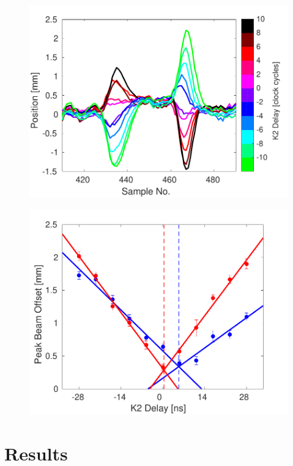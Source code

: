 \documentclass[%
 reprint,
 superscriptaddress,
 amsmath,
 amssymb,
 prstab,
]{revtex4-1}
\begin{document}
\begin{figure}
	\includegraphics[width=\columnwidth]{figs/comis/relDelay_traces}%
	\caption{\label{f:relDelay_traces}
	}
\end{figure}

\begin{figure}
	\includegraphics[width=\columnwidth]{figs/comis/relDelay_fit}%
	\caption{\label{f:relDelay_fit}
	}
\end{figure}

\section{\label{s:results}Results}
\end{document}
